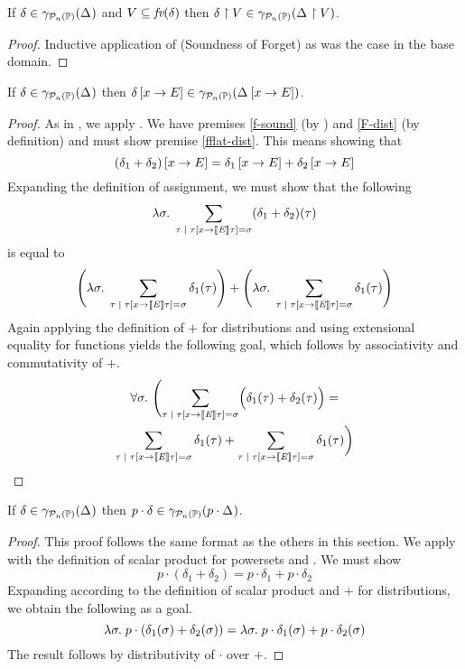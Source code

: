 \begin{lemma}
\label{lem:ppp:project}
If $\delta \in \gamma_{\mathcal{P}_{n}\left( \mathbb{P} \right)}(\Delta_{})$ and $ V \subseteq \textit{fv}(\delta) $ then
$\delta \upharpoonright V \in \gamma_{\mathcal{P}_{n}\left( \mathbb{P} \right)}(\Delta_{} \upharpoonright V) $.
\end{lemma}
\begin{proof} Inductive application of  (Soundness
of Forget) as was the case in the base domain.
\end{proof}

\begin{lemma} \label{lem:ppp:assign}
If $ \delta \in \gamma_{\mathcal{P}_{n}\left( \mathbb{P} \right)}(\Delta_{}) $ then $
\delta\left[ x \rightarrow E \right] \in \gamma_{\mathcal{P}_{n}\left( \mathbb{P} \right)}(\Delta_{} \left[ x \rightarrow E \right]) $.
\end{lemma}
\begin{proof}
  As in , we apply .
  We have premises \ref{f-sound} (by ) and
  \ref{F-dist} (by definition) and must show premise \ref{fflat-dist}.
This means showing that
\[(\delta_1+\delta_2)\left[ x \rightarrow E \right] = \delta_1\left[ x \rightarrow E \right] + \delta_2\left[ x \rightarrow E \right]\]
Expanding the definition of assignment, we must show that the following
$$ \lambda \sigma . \; \sum_{\tau \; | \; \tau
  \left[ x \rightarrow [\![{\mathit{E}}]\!]{\tau} \right] = \sigma} (\delta_1+\delta_2) (\tau) $$
is equal to
$$ \Biggl(\lambda \sigma . \; \sum_{\tau \; | \; \tau
  \left[ x \rightarrow [\![{\mathit{E}}]\!]{\tau} \right] = \sigma} \delta_1 (\tau)\Biggr) +
\Biggl(\lambda \sigma . \;  \sum_{\tau \; | \; \tau
 \left[ x \rightarrow [\![{\mathit{E}}]\!]{\tau} \right] = \sigma} \delta_1 (\tau)\Biggr)$$
Again applying the definition of $+$ for distributions and using extensional equality for functions yields the following goal, which follows by associativity and commutativity of $+$.
\begin{multline*}
\forall \sigma.\ \Biggl(\sum_{\tau \; | \; \tau
  \left[ x \rightarrow [\![{\mathit{E}}]\!]{\tau} \right] = \sigma} \Bigl(\delta_1(\tau)+\delta_2(\tau)\Bigr) = \\
\sum_{\tau \; | \; \tau
  \left[ x \rightarrow [\![{\mathit{E}}]\!]{\tau} \right] = \sigma} \delta_1 (\tau) +
\sum_{\tau \; | \; \tau
 \left[ x \rightarrow [\![{\mathit{E}}]\!]{\tau} \right] = \sigma} \delta_1 (\tau)\biggr)
\end{multline*}
\end{proof}

\begin{lemma} \label{lem:ppp:scalar-prod}
If $ \delta \in \gamma_{\mathcal{P}_{n}\left( \mathbb{P} \right)}(\Delta_{}) $ then $
  p \cdot \delta \in \gamma_{\mathcal{P}_{n}\left( \mathbb{P} \right)}(p \cdot \Delta_{}) $.
\end{lemma}
\begin{proof}
This proof follows the same format as the others in this section.  We apply 
with the definition of scalar product for powersets and .  We must show
\[p \cdot (\delta_1 + \delta_2) = p \cdot \delta_1 + p \cdot \delta_2\]
Expanding according to the definition of scalar product and $+$ for distributions, we obtain the following as a goal.
\[\lambda \sigma . \; p \cdot (\delta_1(\sigma) + \delta_2(\sigma)) = \lambda \sigma . \; p \cdot \delta_1(\sigma) + p \cdot \delta_2(\sigma)\]
The result follows by distributivity of $\cdot$ over $+$.
\end{proof}

